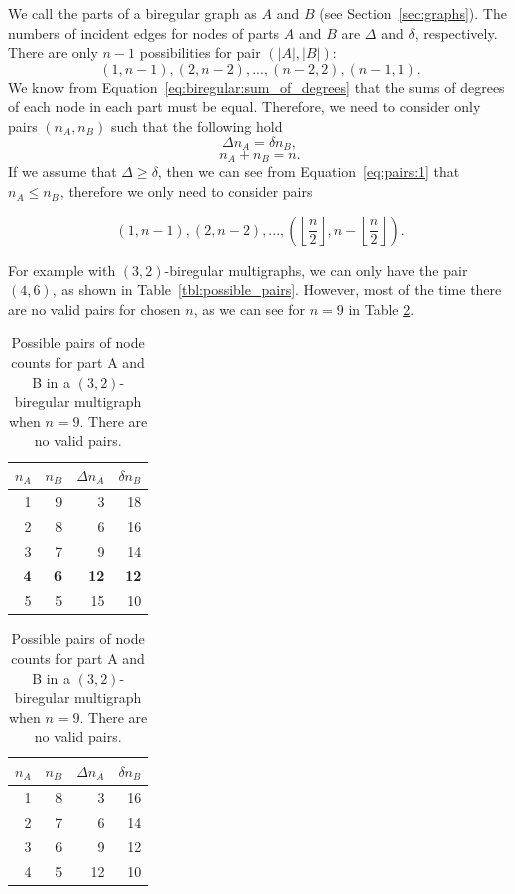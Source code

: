 We call the parts of a biregular graph as $A$ and $B$ (see Section~\ref{sec:graphs}).
The numbers of incident edges for nodes of parts $A$ and $B$ are $\Delta$ and $\delta$, respectively.
There are only $n-1$ possibilities for pair $(|A|, |B|)$:
$$(1, n-1), (2, n-2), ..., (n-2, 2), (n-1, 1).$$
We know from Equation~\ref{eq:biregular:sum_of_degrees} that the sums of degrees of each node in each part must be equal.
Therefore, we need to consider only pairs $(n_A, n_B)$ such that the following hold
\begin{equation} \label{eq:pairs:1}
  \Delta n_A = \delta n_B,
\end{equation}
\begin{equation} \label{eq:pairs:2}
n_A + n_B = n.
\end{equation}
If we assume that $\Delta \geq \delta$, then we can see from Equation~\ref{eq:pairs:1} that $n_A\leq n_B$, therefore we only need to consider pairs

$$(1, n-1), (2, n-2), ..., (\left\lfloor\frac{n}{2}\right\rfloor, n - \left\lfloor\frac{n}{2}\right\rfloor).$$

For example with $(3,2)$-biregular multigraphs, we can only have the pair $(4, 6)$, as shown in Table~\ref{tbl:possible_pairs}.
However, most of the time there are no valid pairs for chosen $n$, as we can see for $n=9$ in Table \ref{tbl:possible_pairs:no_pairs}.

\begin{table}[H]
  \parbox{.45\linewidth}{
    \centering
    \begin{tabular}{rrrr}
    \toprule
    $n_A$&$n_B$&$\Delta n_A$&$\delta n_B$\\
    \midrule
    1 & 9 & 3  & 18\\
    2 & 8 & 6  & 16\\
    3 & 7 & 9  & 14\\
    \textbf{4} & \textbf{6} & \textbf{12} & \textbf{12}\\
    5 & 5 & 15 & 10\\
    \bottomrule
  \end{tabular}
  \caption{
    Possible pairs of node counts for part A and B in a $(3,2)$-biregular multigraph when $n=10$.
    The only valid pair with $\Delta n_A = \delta n_B$ is (4, 6), and it is bolded.
  }
  \label{tbl:possible_pairs}
  }
  \hfill
  \parbox{.45\linewidth}{
  \centering
  \begin{tabular}{rrrr}
    \toprule
    $n_A$&$n_B$&$\Delta n_A$&$\delta n_B$\\
    \midrule
    1 & 8 & 3  & 16\\
    2 & 7 & 6  & 14\\
    3 & 6 & 9  & 12\\
    4 & 5 & 12 & 10\\
    \bottomrule
  \end{tabular}
  \caption{
    Possible pairs of node counts for part A and B in a $(3,2)$-biregular multigraph when $n=9$.
    There are no valid pairs.
  }
  \label{tbl:possible_pairs:no_pairs}
  }
\end{table}

